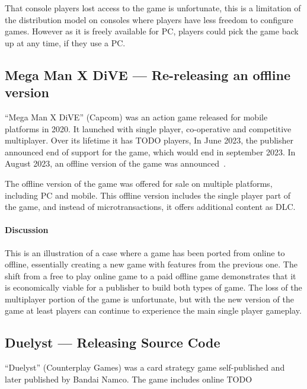 That console players lost access to the game is unfortunate, this is a limitation of the distribution model on consoles where players have less freedom to configure games.
However as it is freely available for PC, players could pick the game back up at any time, if they use a PC.


\subsection{Mega Man X DiVE --- Re-releasing an offline version}
``Mega Man X DiVE'' (Capcom) was an action game released for mobile platforms in 2020.
It launched with single player, co-operative and competitive multiplayer.
Over its lifetime it has TODO players\cn,
In June 2023, the publisher announced end of support for the game, which would end in september 2023\cite{megaman-eos-2023}.
In August 2023, an offline version of the game was announced~\cite{megaman-offline}.

The offline version of the game was offered for sale on multiple platforms, including PC and mobile.
This offline version includes the single player part of the game, and instead of microtransactions, it offers additional content as DLC.

\paragraph*{Discussion}
This is an illustration of a case where a game has been ported from online to offline, essentially creating a new game with features from the previous one.
The shift from a free to play online game to a paid offline game demonstrates that it is economically viable for a publisher to build both types of game.
The loss of the multiplayer portion of the game is unfortunate, but with the new version of the game at least players can continue to experience the main single player gameplay.

\subsection{Duelyst --- Releasing Source Code}
``Duelyst'' (Counterplay Games) was a card strategy game self-published and later published by Bandai Namco.
The game includes online TODO

